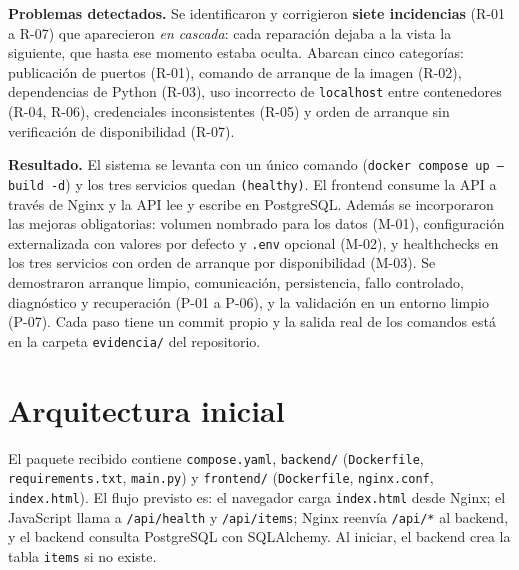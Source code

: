 \documentclass[11pt,a4paper]{article}
\newcommand{\cod}[1]{\texttt{#1}}
\begin{document}
\textbf{Problemas detectados.} Se identificaron y corrigieron \textbf{siete incidencias} (R-01 a R-07) que aparecieron \emph{en cascada}: cada reparación dejaba a la vista la siguiente, que hasta ese momento estaba oculta. Abarcan cinco categorías: publicación de puertos (R-01), comando de arranque de la imagen (R-02), dependencias de Python (R-03), uso incorrecto de \cod{localhost} entre contenedores (R-04, R-06), credenciales inconsistentes (R-05) y orden de arranque sin verificación de disponibilidad (R-07).

\textbf{Resultado.} El sistema se levanta con un único comando (\cod{docker compose up --build -d}) y los tres servicios quedan \cod{(healthy)}. El frontend consume la API a través de Nginx y la API lee y escribe en PostgreSQL. Además se incorporaron las mejoras obligatorias: volumen nombrado para los datos (M-01), configuración externalizada con valores por defecto y \cod{.env} opcional (M-02), y healthchecks en los tres servicios con orden de arranque por disponibilidad (M-03). Se demostraron arranque limpio, comunicación, persistencia, fallo controlado, diagnóstico y recuperación (P-01 a P-06), y la validación en un entorno limpio (P-07). Cada paso tiene un commit propio y la salida real de los comandos está en la carpeta \cod{evidencia/} del repositorio.

\section{Arquitectura inicial}

El paquete recibido contiene \cod{compose.yaml}, \cod{backend/} (\cod{Dockerfile}, \cod{requirements.txt}, \cod{main.py}) y \cod{frontend/} (\cod{Dockerfile}, \cod{nginx.conf}, \cod{index.html}). El flujo previsto es: el navegador carga \cod{index.html} desde Nginx; el JavaScript llama a \cod{/api/health} y \cod{/api/items}; Nginx reenvía \cod{/api/*} al backend, y el backend consulta PostgreSQL con SQLAlchemy. Al iniciar, el backend crea la tabla \cod{items} si no existe.
\end{document}
